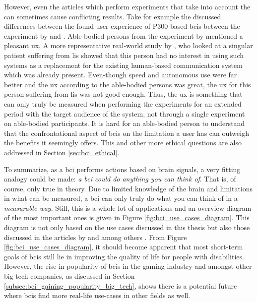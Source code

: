 However, even the articles which perform experiments that take into account the  can sometimes cause conflicting results.
Take for example the discussed differences between the found user experience of P300 based \glspl{bci} between the experiment by \citet{eye_tracking_vs_p300_comparable} and \citet{no_interest_in_using_p300}.
Able-bodied persons from the experiment by \citet{eye_tracking_vs_p300_comparable} mentioned a pleasant \gls{ux}.
A more representative real-world study by \citet{no_interest_in_using_p300}, who looked at a singular patient suffering from \gls{lis} showed that this person had no interest in using such systems as a replacement for the existing human-based communication system which was already present.
Even-though speed and autonomous use were far better and the \gls{ux} according to the able-bodied persons was great, the \gls{ux} for this person suffering from \gls{lis} was not good enough.
Thus, the \gls{ux} is something that can only truly be measured when performing the experiments for an extended period with the target audience of the system, not through a single experiment on able-bodied participants.
It is hard for an able-bodied person to understand that the confrontational aspect of \glspl{bci} on the limitation a user has can outweigh the benefits it seemingly offers.
This and other more ethical questions are also addressed in Section \ref{sec:bci_ethical}.

To summarize, as a \gls{bci} performs actions based on brain signals, a very fitting analogy could be made: \textit{a \gls{bci} could do anything you can think of}.
That is, of course, only true in theory.
Due to limited knowledge of the brain \citep{brainmapping} and limitations in what can be measured, a \gls{bci} can only truly do what you can think of in a \textit{measurable way}.
Still, this is a whole lot of applications and an overview diagram of the most important ones is given in Figure \ref{fig:bci_use_cases_diagram}.
This diagram is not only based on the use cases discussed in this thesis but also those discussed in the articles by \citet{bci_review_arnau} and \citet{bci_applications} among others \citep{bci_review_book_chapter, bci_review, bci_in_medicine, bci_history, bci_review_monkey, bci_handbook}.
From Figure \ref{fig:bci_use_cases_diagram}, it should become apparent that most short-term goals of \glspl{bci} still lie in improving the quality of life for people with disabilities.
However, the rise in popularity of \glspl{bci} in the gaming industry and amongst other big tech companies, as discussed in Section \ref{subsec:bci_gaining_popularity_big_tech}, shows there is a potential future where \glspl{bci} find more real-life use-cases in other fields as well.

